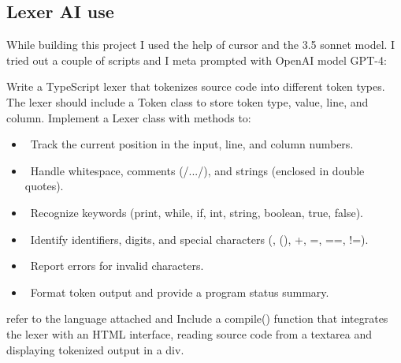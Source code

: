 \documentclass[12pt]{article}
\begin{document}
\subsection{Lexer AI use}
While building this project I used the help of cursor and the 3.5 sonnet model. I tried out a couple of scripts and I meta prompted with OpenAI model GPT-4: 

Write a TypeScript lexer that tokenizes source code into different token types. The lexer should include a Token class to store token type, value, line, and column. Implement a Lexer class with methods to: 
\begin{itemize}
    \item \ Track the current position in the input, line, and column numbers.
    \item \ Handle whitespace, comments (/.../), and strings (enclosed in double quotes).
    \item \ Recognize keywords (print, while, if, int, string, boolean, true, false).
    \item \ Identify identifiers, digits, and special characters ({}, (), +, =, ==, !=).
    \item \ Report errors for invalid characters.
    \item \ Format token output and provide a program status summary.
\end{itemize}

refer to the language attached and Include a compile() function that integrates the lexer with an HTML interface, reading source code from a textarea and displaying tokenized output in a div.
\end{document}
